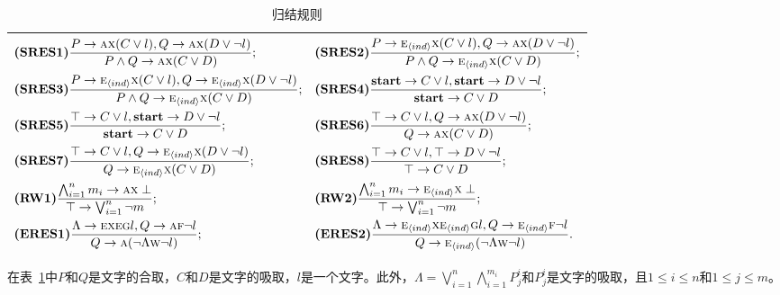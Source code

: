 \begin{table}[tb]%
	\small
	\centering
	\caption{归结规则}\label{tab:res}
	\begin{tabular}{l}
		\toprule
		$
		\begin{aligned}
			& \textbf{(SRES1)}\frac{P\rightarrow \textsc{a}\textsc{x}(C\vee l), Q\rightarrow \textsc{a}\textsc{x}(D\vee \neg l)}{P\wedge Q \rightarrow \textsc{a}\textsc{x}(C\vee D)};
			&& \textbf{(SRES2)} \frac{P\rightarrow \textsc{e}_{{\langle{ind}\rangle}} \textsc{x}(C\vee l), Q\rightarrow \textsc{a}\textsc{x}(D\vee \neg l)}{P\wedge Q \rightarrow \textsc{e}_{{\langle{ind}\rangle}}\textsc{x}(C\vee D)};\\
			& \textbf{(SRES3)} \frac{P\rightarrow \textsc{e}_{{\langle{ind}\rangle}}\textsc{x}(C\vee l), Q \rightarrow \textsc{e}_{{\langle{ind}\rangle}}\textsc{x}(D\vee \neg l)}{P\wedge Q\rightarrow\textsc{e}_{{\langle{ind}\rangle}}\textsc{x}(C\vee D)};  
			&&   \textbf{(SRES4)} \frac{\textbf{start} \rightarrow C\vee l, \textbf{start} \rightarrow D \vee \neg l}{\textbf{start} \rightarrow C\vee D}; \\
			& \textbf{(SRES5)} \frac{\top \rightarrow C\vee l, \textbf{start} \rightarrow D \vee \neg l}{\textbf{start} \rightarrow C \vee D};
			&&  \textbf{(SRES6)} \frac{\top \rightarrow C \vee l, Q \rightarrow \textsc{a}\textsc{x}(D \vee \neg l)}{Q\rightarrow \textsc{a} \textsc{x}(C\vee D)}; \\
			& \textbf{(SRES7)} \frac{\top \rightarrow C \vee l, Q \rightarrow \textsc{e}_{{\langle{ind}\rangle}} \textsc{x}(D \vee \neg l)}{Q\rightarrow \textsc{e}_{{\langle{ind}\rangle}}\textsc{x}(C\vee D)}; 
			&&  \textbf{(SRES8)} \frac{\top \rightarrow C\vee l, \top \rightarrow D \vee \neg l}{\top \rightarrow C \vee D};\\
			& \textbf{(RW1)} \frac{\bigwedge_{i=1}^n m_i \rightarrow \textsc{a}\textsc{x} \perp}{\top \rightarrow \bigvee_{i=1}^n \neg m}; 
			&& \textbf{(RW2)} \frac{\bigwedge_{i=1}^n m_i \rightarrow \textsc{e}_{{\langle{ind}\rangle}}\textsc{x} \perp}{\top \rightarrow \bigvee_{i=1}^n \neg m}; \\
			& \textbf{(ERES1)} \frac{\Lambda \rightarrow \textsc{e} \textsc{x} \textsc{e}\textsc{g} l, Q \rightarrow \textsc{a} \textsc{f} \neg l}{Q \rightarrow \textsc{a}(\neg \Lambda \textsc{w} \neg l)};
			&& \textbf{(ERES2)} \frac{\Lambda \rightarrow \textsc{e}_{{\langle{ind}\rangle}} \textsc{x} \textsc{e}_{{\langle{ind}\rangle}}\textsc{g} l, Q \rightarrow \textsc{e}_{{\langle{ind}\rangle}} \textsc{f} \neg l}{Q \rightarrow \textsc{e}_{{\langle{ind}\rangle}}(\neg \Lambda \textsc{w} \neg l)}.
		\end{aligned}
		$\\
		\bottomrule
	\end{tabular}
\end{table}
在表~\ref{tab:res}中$P$和$Q$是文字的合取，$C$和$D$是文字的吸取，$l$是一个文字。此外，$\Lambda=\bigvee_{i=1}^n \bigwedge_{i=1}^{m_i}P_j^i$和$P_j^i$是文字的吸取，且$1\leq i\leq n$和$1\leq j\leq m$。

